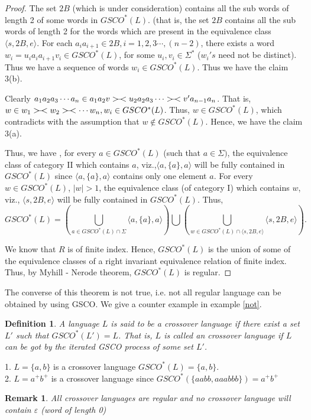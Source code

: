 \documentclass{llncs}
\newtheorem{defin}{Definition}
\newtheorem{rem}{Remark}
\newcommand{\ve}{\varepsilon}
\newcommand{\ers}{>\hspace{-2mm}-\hspace{-2mm}<}
\begin{document}
\begin{proof}
\par The set $2B$ (which is under consideration) contains all the sub
words of length 2 of some words in $GSCO^*(L)$. (that is, the set
$2B$ contains all the sub words of length 2 for the words which are
present in the equivalence class $\langle s,2B,e\rangle $.  For each
$a_ia_{i+1} \in  2B,  i = 1,2,3 \cdots, (n-2)$, there exists a word
$w_i = u_ia_ia_{i+1}v_i \in GSCO^*(L)$, for some $u_i,v_i \in
\Sigma^*$ ($w_i's$ need not be distinct). Thus we have a sequence of
words $w_i \in GSCO^*(L)$. Thus we have the claim 3(b).

\par Clearly $a_1a_2a_3\cdots a_n\in a_1a_2v \ers u_2a_2a_3\cdots\ers
v'a_{n-1}a_n$. That is, $w \in
 w_1 \ers w_2 \ers \cdots w_n,  w_i \in GSCO^*(L)$. Thus,
$w \in GSCO^*(L)$, which contradicts with the assumption that $w
\notin GSCO^*(L)$.  Hence, we have the claim 3(a).

\par Thus, we have , for every $a \in  GSCO^*(L)$ (such that $a \in
\Sigma)$, the equivalence class of category II which contains $a$,
viz.,$ \langle a,\{a\},a\rangle $ will be fully contained in
$GSCO^*(L)$ since $\langle a,\{a\},a\rangle $ contains only one
element $a$.  For every $w \in GSCO^*(L)$,  $|w| > 1$, the
equivalence class (of category I) which contains $w$, viz., $\langle
s,2B,e\rangle $ will be fully contained in $GSCO^*(L)$. Thus,
\[
GSCO^*(L) =  (\bigcup_{a \in GSCO^*(L) \cap \Sigma} \langle
a,\{a\},a\rangle ) \bigcup (\bigcup_{w \in GSCO^*(L) \cap \langle
s,2B,e\rangle } \langle s,2B,e\rangle). \]


 We know that $R$ is of finite index.  Hence, $GSCO^*(L)$ is the
 union of some of the equivalence classes of a right invariant
 equivalence relation of finite index. Thus, by  Myhill - Nerode theorem,
 $GSCO^*(L)$ is regular.
\end{proof}
\par The converse of this theorem is not true, i.e. not all regular
 language can be obtained by using GSCO. We give a counter example in example \ref{not}.


\begin{defin}
A language $L$ is said to be a crossover language if there exist a
set $L'$ such that $GSCO^*(L') = L$.  That is, $L$ is called an
crossover language if $L$ can be got by the iterated GSCO process of
some set $L'$.
\end{defin}
\begin{example}
1. $L = \{a,b\}$ is a crossover language  $GSCO^*(L) = \{a,b\}$.\\
 2. $L = a^+b^+$ is a crossover language since $GSCO^*(\{aabb,
aaabbb\})  =   a^+b^+$
\end{example}
\begin{rem}
All crossover languages are regular and no crossover language will
contain $\ve$ (word of length 0)
\end{rem}
\end{document}
